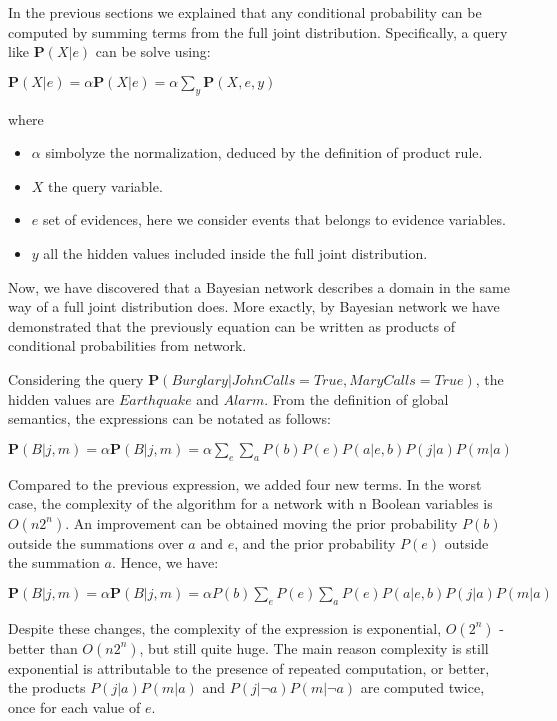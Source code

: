 In the previous sections we explained that any conditional probability can be computed by summing terms from the full joint distribution. Specifically, a query like $\mathbf{P}(X|e)$
can be solve using:
\begin{center}
    $\mathbf{P}(X|e) = \alpha \mathbf{P}(X|e) = \alpha \sum_{y}\mathbf{P}(X, e, y)$
\end{center}
where
\begin{itemize}
    \renewcommand{\labelitemi}{-}
    \item $\alpha$ simbolyze the normalization, deduced by the definition of product rule.
    \item $X$ the query variable.
    \item $e$ set of evidences, here we consider events that belongs to evidence variables.
    \item $y$ all the hidden values included inside the full joint distribution.
\end{itemize} \vspace{3.5pt}
Now, we have discovered that a Bayesian network describes a domain in the same way of a full joint distribution does. More exactly, by Bayesian network we have demonstrated
that the previously equation can be written as products of conditional probabilities from network. \vspace{7pt}

Considering the query $\mathbf{P}(Burglary|JohnCalls=True, MaryCalls=True)$, the hidden values are $Earthquake$ and $Alarm$. From the definition of global semantics, the expressions
can be notated as follows:
\begin{center}
    $\mathbf{P}(B|j, m) = \alpha \mathbf{P}(B|j, m) = \alpha \sum_{e}\sum_{a}P(b)P(e)P(a|e, b)P(j|a)P(m|a)$
\end{center}
Compared to the previous expression, we added four new terms. In the worst case, the complexity of the algorithm for a network with n Boolean variables is $O(n2^n)$. 
An improvement can be obtained moving the prior probability $P(b)$ outside the summations over $a$ and $e$, and the prior probability $P(e)$ outside the summation $a$.
Hence, we have:
\begin{center}
    $\mathbf{P}(B|j, m) = \alpha \mathbf{P}(B|j, m) = \alpha P(b)\sum_{e}P(e)\sum_{a}P(e)P(a|e, b)P(j|a)P(m|a)$
\end{center}
Despite these changes, the complexity of the expression is exponential, $O(2^n)$ - better than $O(n2^n)$, but still quite huge. The main reason complexity is still exponential
is attributable to the presence of repeated computation, or better, the products $P(j|a)P(m|a)$ and $P(j|\neg a)P(m|\neg a)$ are computed twice, once for each value of $e$.